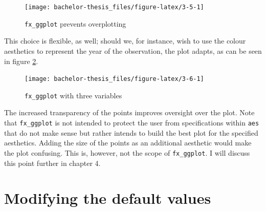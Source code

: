 \documentclass[]{report}
\newenvironment{Shaded}{\begin{snugshade}}{\end{snugshade}}
\newcommand{\KeywordTok}[1]{\textcolor[rgb]{0.13,0.29,0.53}{\textbf{#1}}}
\newcommand{\DataTypeTok}[1]{\textcolor[rgb]{0.13,0.29,0.53}{#1}}
\newcommand{\StringTok}[1]{\textcolor[rgb]{0.31,0.60,0.02}{#1}}
\newcommand{\OperatorTok}[1]{\textcolor[rgb]{0.81,0.36,0.00}{\textbf{#1}}}
\newcommand{\NormalTok}[1]{#1}
\theoremstyle{definition}
\theoremstyle{definition}
\theoremstyle{definition}
\theoremstyle{remark}
\begin{document}
\begin{figure}

{\centering \texttt{[image: bachelor-thesis\_files/figure-latex/3-5-1]} 

}

\caption{\texttt{fx\_ggplot} prevents overplotting}\label{fig:3-5}
\end{figure}



This choice is flexible, as well; should we, for instance, wish to use
the colour aesthetics to represent the year of the observation, the plot
adapts, as can be seen in figure \ref{fig:3-6}.

\begin{Shaded}
\end{Shaded}

\begin{figure}

{\centering \texttt{[image: bachelor-thesis\_files/figure-latex/3-6-1]} 

}

\caption{\texttt{fx\_ggplot} with three variables}\label{fig:3-6}
\end{figure}



The increased transparency of the points improves oversight over the
plot. Note that \texttt{fx\_ggplot} is not intended to protect the user
from specifications within \texttt{aes} that do not make sense but
rather intends to build the best plot for the specified aesthetics.
Adding the size of the points as an additional aesthetic would make the
plot confusing. This is, however, not the scope of \texttt{fx\_ggplot}.
I will discuss this point further in chapter 4.

\section{Modifying the default
values}\label{modifying-the-default-values}
\end{document}
